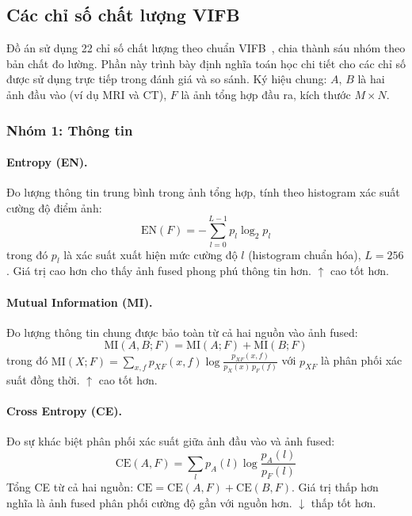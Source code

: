 \subsection{Các chỉ số chất lượng VIFB}
\label{ssec:metrics}

Đồ án sử dụng 22 chỉ số chất lượng theo chuẩn VIFB~\cite{liu2020vifb}, chia thành sáu nhóm theo bản chất đo lường. Phần này trình bày định nghĩa toán học chi tiết cho các chỉ số được sử dụng trực tiếp trong đánh giá và so sánh. Ký hiệu chung: $A$, $B$ là hai ảnh đầu vào (ví dụ MRI và CT), $F$ là ảnh tổng hợp đầu ra, kích thước $M \times N$.

\subsubsection*{Nhóm 1: Thông tin}

\paragraph{Entropy (EN).}
Đo lượng thông tin trung bình trong ảnh tổng hợp, tính theo histogram xác suất cường độ điểm ảnh:
\begin{equation}
\mathrm{EN}(F) = -\sum_{l=0}^{L-1} p_l \log_2 p_l
\end{equation}
trong đó $p_l$ là xác suất xuất hiện mức cường độ $l$ (histogram chuẩn hóa), $L=256$. Giá trị cao hơn cho thấy ảnh fused phong phú thông tin hơn. $\uparrow$ cao tốt hơn.

\paragraph{Mutual Information (MI).}
Đo lượng thông tin chung được bảo toàn từ cả hai nguồn vào ảnh fused:
\begin{equation}
\mathrm{MI}(A,B;F) = \mathrm{MI}(A;F) + \mathrm{MI}(B;F)
\end{equation}
trong đó $\mathrm{MI}(X;F) = \sum_{x,f} p_{XF}(x,f)\log\frac{p_{XF}(x,f)}{p_X(x)\,p_F(f)}$ với $p_{XF}$ là phân phối xác suất đồng thời. $\uparrow$ cao tốt hơn.

\paragraph{Cross Entropy (CE).}
Đo sự khác biệt phân phối xác suất giữa ảnh đầu vào và ảnh fused:
\begin{equation}
\mathrm{CE}(A,F) = \sum_l p_A(l)\log\frac{p_A(l)}{p_F(l)}
\end{equation}
Tổng CE từ cả hai nguồn: $\mathrm{CE} = \mathrm{CE}(A,F)+\mathrm{CE}(B,F)$. Giá trị thấp hơn nghĩa là ảnh fused phân phối cường độ gần với nguồn hơn. $\downarrow$ thấp tốt hơn.

